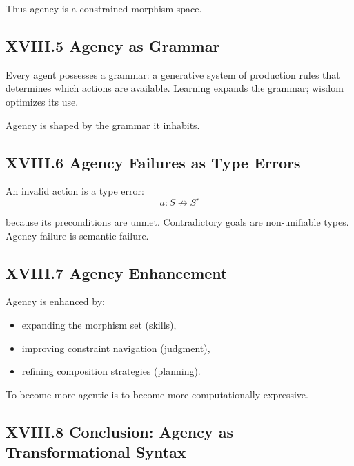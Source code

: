 \documentclass[11pt,letterpaper]{article}
\begin{document}
Thus agency is a constrained morphism space.

\subsection{XVIII.5 Agency as Grammar}

Every agent possesses a grammar: a generative system of production rules that determines which actions are available. Learning expands the grammar; wisdom optimizes its use.

Agency is shaped by the grammar it inhabits.

\subsection{XVIII.6 Agency Failures as Type Errors}

An invalid action is a type error:
\[
a : S \not\to S'
\]

because its preconditions are unmet. Contradictory goals are non-unifiable types. Agency failure is semantic failure.

\subsection{XVIII.7 Agency Enhancement}

Agency is enhanced by:

\begin{itemize}
    \item expanding the morphism set (skills),
    \item improving constraint navigation (judgment),
    \item refining composition strategies (planning).
\end{itemize}

To become more agentic is to become more computationally expressive.

\subsection{XVIII.8 Conclusion: Agency as Transformational Syntax}
\end{document}
